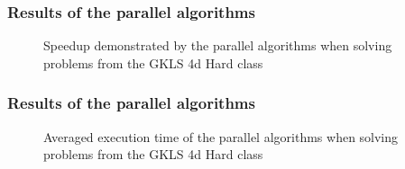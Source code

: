 \documentclass[aspectratio=1610]{beamer}
\begin{document}
\begin{frame}
  \frametitle{Results of the parallel algorithms}
  \begin{figure}[ht]
    \centering
    \caption{Speedup demonstrated by the parallel algorithms when solving problems from the GKLS 4d Hard class}
  \end{figure}
\end{frame}

\begin{frame}
  \frametitle{Results of the parallel algorithms}
  \begin{figure}[ht]
    \centering
    \caption{Averaged execution time of the parallel algorithms when solving problems from the GKLS 4d Hard class}
  \end{figure}
\end{frame}
\end{document}
